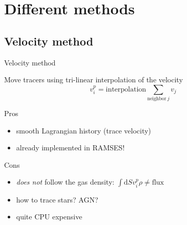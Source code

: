 \documentclass{beamer}
\begin{document}
\section{Different methods}
\subsection{Velocity method}
\begin{frame}{Velocity method}

  Move tracers using tri-linear interpolation of the velocity
  \begin{equation}
    v^p_i = \text{interpolation}\sum_{\text{neighbor}\ j} v_j
  \end{equation}

  \begin{block}{Pros}
    \begin{itemize}
    \item
      smooth Lagrangian history (trace velocity)
    \item
      already implemented in RAMSES!
    \end{itemize}
  \end{block}
  \pause
  \begin{block}{Cons}
    \begin{itemize}
    \item
      \emph{does not} follow the gas density: $\int\text{d}S v^p_i\rho
      \neq \text{flux}$
    \item
      how to trace stars? AGN?
    \item
      quite CPU expensive
    \end{itemize}
  \end{block}

\end{frame}
\end{document}
